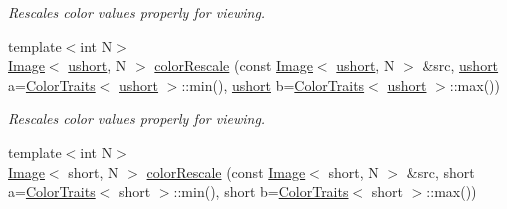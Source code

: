 \begin{DoxyCompactItemize}
\begin{DoxyCompactList}\small\item\em Rescales color values properly for viewing. \end{DoxyCompactList}\item 
\hypertarget{group___image_gadcb06b3bb92c3caebf9fe27518bfef40}{{\footnotesize template$<$int N$>$ }\\\hyperlink{class_d_o_1_1_image}{Image}$<$ \hyperlink{group___eigen_typedefs_gab95f123a6c9bcfee6a343170ef8c5f69}{ushort}, N $>$ \hyperlink{group___image_gadcb06b3bb92c3caebf9fe27518bfef40}{color\-Rescale} (const \hyperlink{class_d_o_1_1_image}{Image}$<$ \hyperlink{group___eigen_typedefs_gab95f123a6c9bcfee6a343170ef8c5f69}{ushort}, N $>$ \&src, \hyperlink{group___eigen_typedefs_gab95f123a6c9bcfee6a343170ef8c5f69}{ushort} a=\hyperlink{struct_d_o_1_1_color_traits}{Color\-Traits}$<$ \hyperlink{group___eigen_typedefs_gab95f123a6c9bcfee6a343170ef8c5f69}{ushort} $>$\-::min(), \hyperlink{group___eigen_typedefs_gab95f123a6c9bcfee6a343170ef8c5f69}{ushort} b=\hyperlink{struct_d_o_1_1_color_traits}{Color\-Traits}$<$ \hyperlink{group___eigen_typedefs_gab95f123a6c9bcfee6a343170ef8c5f69}{ushort} $>$\-::max())}\label{group___image_gadcb06b3bb92c3caebf9fe27518bfef40}

\begin{DoxyCompactList}\small\item\em Rescales color values properly for viewing. \end{DoxyCompactList}\item 
\hypertarget{group___image_gad1637ce411303db7d9633a8227bdcdaa}{{\footnotesize template$<$int N$>$ }\\\hyperlink{class_d_o_1_1_image}{Image}$<$ short, N $>$ \hyperlink{group___image_gad1637ce411303db7d9633a8227bdcdaa}{color\-Rescale} (const \hyperlink{class_d_o_1_1_image}{Image}$<$ short, N $>$ \&src, short a=\hyperlink{struct_d_o_1_1_color_traits}{Color\-Traits}$<$ short $>$\-::min(), short b=\hyperlink{struct_d_o_1_1_color_traits}{Color\-Traits}$<$ short $>$\-::max())}\label{group___image_gad1637ce411303db7d9633a8227bdcdaa}


\end{DoxyCompactItemize}
